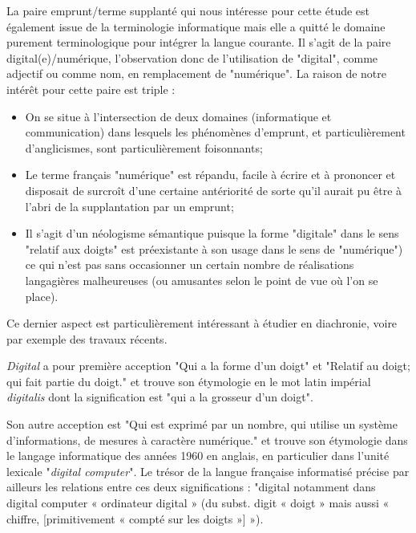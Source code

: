   La paire emprunt/terme supplanté qui nous intéresse pour cette étude est également issue de la terminologie informatique mais elle a quitté le domaine purement terminologique pour intégrer la langue courante.
Il s'agit de la paire digital(e)/numérique, l'observation donc de l'utilisation de "digital", comme adjectif ou comme nom, en remplacement de "numérique".
 La raison de notre intérêt pour cette paire est triple :
 \begin{itemize}
     \item On se situe à l'intersection de deux domaines (informatique et communication) dans lesquels les phénomènes d'emprunt, et particulièrement d'anglicismes, sont particulièrement foisonnants;
     \item Le terme français "numérique" est répandu, facile à écrire et à prononcer et disposait de surcroît d'une certaine antériorité de sorte qu'il aurait pu être à l'abri de la supplantation par un emprunt;
     \item Il s'agit d'un néologisme sémantique \cite{Moeschler-1974, Sablayrolles-2012} puisque la forme "digitale" dans le sens "relatif aux doigts" est préexistante à son usage dans le sens de "numérique") ce qui n'est pas sans occasionner un certain nombre de réalisations langagières malheureuses (ou amusantes selon le point de vue où l'on se place).
 \end{itemize}

Ce dernier aspect est particulièrement intéressant à étudier en diachronie, voire par exemple des travaux récents\cite{Jurafski-2016, Cartier-2016}.


 \textit{Digital} a pour première acception "Qui a la forme d'un doigt" et "Relatif au doigt; qui fait partie du doigt." et trouve son étymologie en le mot latin impérial \textit{digitalis} dont la signification est "qui a la grosseur d'un doigt".

Son autre acception est "Qui est exprimé par un nombre, qui utilise un système d'informations, de mesures à caractère numérique." et trouve son étymologie dans le langage informatique des années 1960 en anglais, en particulier dans l'unité lexicale "\textit{digital computer}".
 Le trésor de la langue française informatisé précise par ailleurs les relations entre ces deux significations : "digital notamment dans digital computer « ordinateur digital » (du subst. digit « doigt » mais aussi « chiffre, [primitivement « compté sur les doigts »] »). %

